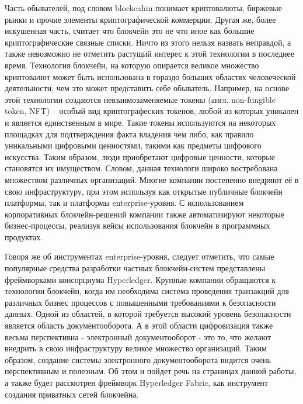 
{\actuality} 
Часть обывателей, под словом blockcahin понимает криптовалюты, биржевые рынки и прочие элементы криптографической коммерции.
Другая же, более искушенная часть, считает что блокчейн это не что иное как большие криптографические связные списки. Ничто из этого нельзя назвать неправдой, а также невозможно не отметить растущий интерес к этой технологии в последнее время. Технология блокчейн, на которую опирается великое множество криптовалют может быть использована в гораздо больших областях человеческой деятельности, чем это может представить себе обыватель.
Например, на основе этой технологии создаются невзаимозаменяемые токены\cite{nft} (англ. non-fungible token, NFT) – особый вид криптографеских токенов, любой из которых уникален и является единственным в мире. Такие токены используются на некоторых площадках для подтверждения факта владения чем либо, как правило уникальными цифровыми ценностями, такими как предметы цифрового искусства. Таким образом, люди приобретают цифровые ценности, которые становятся их имуществом. Словом, данная технологи широко востребована множеством различных организаций. Многие компании постепенно внедряют её в свою инфраструктуру, при этом используя как открытые публичные блокчейн платформы, так и платформы enterprise-уровня. С использованием корпоративных блокчейн-решений компании также автоматизируют некоторые бизнес-процессы, реализуя кейсы использования блокчейн в программных продуктах.

Говоря же об инструментах enterprise-уровня, следует отметить, что самые популярные средства разработки частных блокчейн-систем представлены фреймворками консорциума Hyperledger. Крупные компании обращаются к технологии блокчейн, когда им необходима система проведения транзакций для различных бизнес процессов с повышенными требованиями к безопасности данных. Одной из областей, в которой требуется высокий уровень безопасности является область документооборота. А в этой области цифровизация также весьма перспективна - электронный документооборот - это то, что желают внедрить в свою инфраструктуру великое множество организаций. Таким образом, создание системы электронного документооборота видится очень перспективным и полезным. Об этом и пойдет речь на страницах данной работы, а также будет рассмотрен фреймворк Hyperledger Fabric, как инструмент создания приватных сетей блокчейна.


